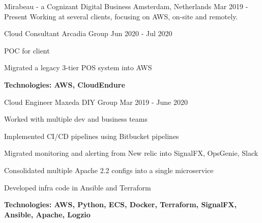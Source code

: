 


\begin{cventries}

{Mirabeau - a Cognizant Digital Business}
{Amsterdam, Netherlands}
{Mar 2019 - Present}
{Working at several clients, focusing on AWS, on-site and remotely.}

\hfill\begin{minipage}{\dimexpr\textwidth-1cm}
\xdef\tpd{\the\prevdepth}
\begin{cventrystack}
	\cventry
	{Cloud Consultant} %
	{Arcadia Group} %
	{} %
	{Jun 2020 - Jul 2020} %
	{ %
		\begin{cvitems}
			\item {POC for client}
			\item {Migrated a legacy 3-tier POS system into AWS}
			\item {\bfseries{Technologies:} AWS, CloudEndure}
		\end{cvitems}
	}

	\cventry
	{Cloud Engineer} %
	{Maxeda DIY Group} %
	{} %
	{Mar 2019 - June 2020} %
	{ %
		\begin{cvitems}
			\item {Worked with multiple dev and business teams}
			\item {Implemented CI/CD pipelines using Bitbucket pipelines}
			\item {Migrated monitoring and alerting from New relic into SignalFX, OpsGenie, Slack}
			\item {Consolidated multiple Apache 2.2 configs into a single microservice}
			\item {Developed infra code in Ansible and Terraform}
			\item {\bfseries{Technologies:} AWS, Python, ECS, Docker, Terraform, SignalFX, Ansible, Apache, Logzio}
		\end{cvitems}
	}
\end{cventrystack}
\end{minipage}



\end{cventries}
